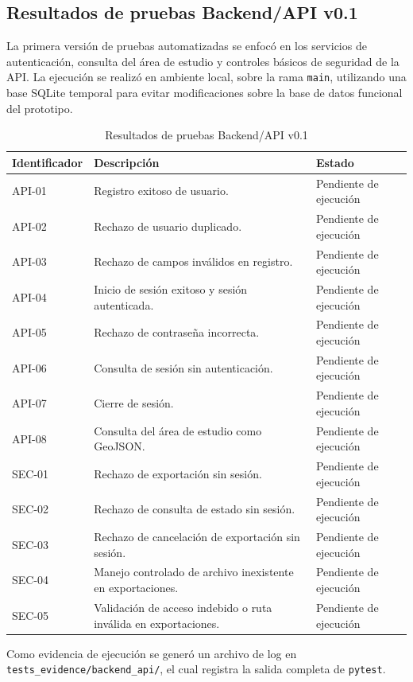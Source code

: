 
\subsection{Resultados de pruebas Backend/API v0.1}

La primera versión de pruebas automatizadas se enfocó en los servicios de autenticación,
consulta del área de estudio y controles básicos de seguridad de la API. La ejecución se
realizó en ambiente local, sobre la rama \texttt{main}, utilizando una base SQLite temporal
para evitar modificaciones sobre la base de datos funcional del prototipo.

\begin{table}[H]
\centering
\begin{tabular}{|p{3cm}|p{7cm}|p{3cm}|}
\hline
\textbf{Identificador} & \textbf{Descripción} & \textbf{Estado} \\
\hline
API-01 & Registro exitoso de usuario. & Pendiente de ejecución \\
\hline
API-02 & Rechazo de usuario duplicado. & Pendiente de ejecución \\
\hline
API-03 & Rechazo de campos inválidos en registro. & Pendiente de ejecución \\
\hline
API-04 & Inicio de sesión exitoso y sesión autenticada. & Pendiente de ejecución \\
\hline
API-05 & Rechazo de contraseña incorrecta. & Pendiente de ejecución \\
\hline
API-06 & Consulta de sesión sin autenticación. & Pendiente de ejecución \\
\hline
API-07 & Cierre de sesión. & Pendiente de ejecución \\
\hline
API-08 & Consulta del área de estudio como GeoJSON. & Pendiente de ejecución \\
\hline
SEC-01 & Rechazo de exportación sin sesión. & Pendiente de ejecución \\
\hline
SEC-02 & Rechazo de consulta de estado sin sesión. & Pendiente de ejecución \\
\hline
SEC-03 & Rechazo de cancelación de exportación sin sesión. & Pendiente de ejecución \\
\hline
SEC-04 & Manejo controlado de archivo inexistente en exportaciones. & Pendiente de ejecución \\
\hline
SEC-05 & Validación de acceso indebido o ruta inválida en exportaciones. & Pendiente de ejecución \\
\hline
\end{tabular}
\caption{Resultados de pruebas Backend/API v0.1}
\end{table}

Como evidencia de ejecución se generó un archivo de log en
\texttt{tests\_evidence/backend\_api/}, el cual registra la salida completa de \texttt{pytest}.

